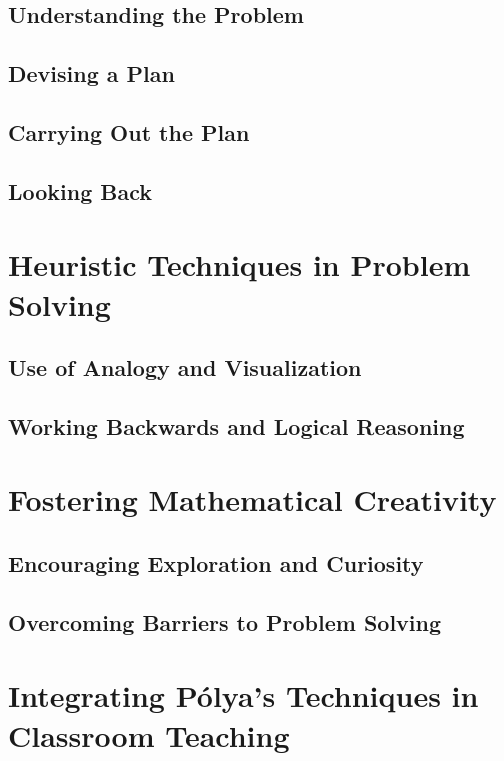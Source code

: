 \documentclass{book}
\begin{document}
\subsection{Understanding the Problem}
\subsection{Devising a Plan}
\subsection{Carrying Out the Plan}
\subsection{Looking Back}


\section{Heuristic Techniques in Problem Solving}
\subsection{Use of Analogy and Visualization}
\subsection{Working Backwards and Logical Reasoning}


\section{Fostering Mathematical Creativity}
\subsection{Encouraging Exploration and Curiosity}
\subsection{Overcoming Barriers to Problem Solving}


\section{Integrating Pólya's Techniques in Classroom Teaching}
\end{document}
